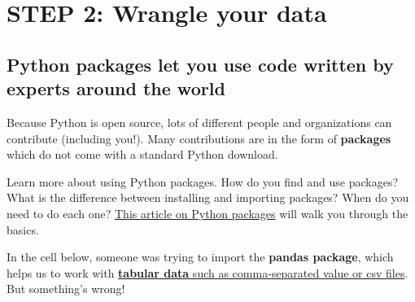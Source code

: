 \documentclass[
  letterpaper,
  DIV=11,
  numbers=noendperiod,
  oneside]{scrreprt}
\begin{document}

\chapter{STEP 2: Wrangle your data}\label{step-2-wrangle-your-data-1}

\section{\texorpdfstring{Python \textbf{packages} let you use code
written by experts around the
world}{Python packages let you use code written by experts around the world}}\label{python-packages-let-you-use-code-written-by-experts-around-the-world-1}

Because Python is open source, lots of different people and
organizations can contribute (including you!). Many contributions are in
the form of \textbf{packages} which do not come with a standard Python
download.

\begin{tcolorbox}[enhanced jigsaw, colbacktitle=quarto-callout-color!10!white, opacityback=0, bottomtitle=1mm, toptitle=1mm, bottomrule=.15mm, left=2mm, colframe=quarto-callout-color-frame, leftrule=.75mm, opacitybacktitle=0.6, colback=white, rightrule=.15mm, toprule=.15mm, breakable, titlerule=0mm, title=\textcolor{quarto-callout-color}{\faInfo}\hspace{0.5em}{Read More: Packages need to be installed and imported.}, coltitle=black, arc=.35mm]

Learn more about using Python packages. How do you find and use
packages? What is the difference between installing and importing
packages? When do you need to do each one?
\href{https://www.earthdatascience.org/courses/intro-to-earth-data-science/python-code-fundamentals/use-python-packages/}{This
article on Python packages} will walk you through the basics.

\end{tcolorbox}

In the cell below, someone was trying to import the \textbf{pandas
package}, which helps us to work with
\href{https://www.earthdatascience.org/courses/intro-to-earth-data-science/file-formats/use-text-files/}{\textbf{tabular
data} such as comma-separated value or csv files}. But something's
wrong!
\end{document}
